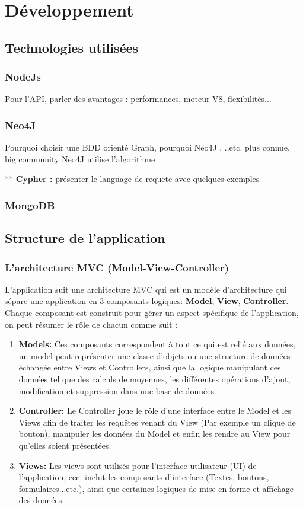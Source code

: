 \chapter{Développement}
\section{Technologies utilisées}
\subsection{NodeJs}
Pour l'API, parler des avantages : performances, moteur V8, flexibilités...  
\subsection{Neo4J}
Pourquoi choisir une BDD orienté Graph, pourquoi Neo4J , ..etc.
plus connue, big community
Neo4J utilise l'algorithme 

** \textbf{Cypher : } présenter le language de requete avec quelques exemples
\subsection{MongoDB}
		
\section{Structure de l'application}
	\subsection{L'architecture MVC (Model-View-Controller)}
	L'application suit une architecture MVC qui est un modèle d'architecture qui sépare une application en 3 composants logiques: \textbf{Model}, \textbf{View}, \textbf{Controller}.
	Chaque composant est construit pour gérer un aspect spécifique de l'application, on peut résumer le rôle de chacun comme suit :
	\begin{enumerate}
	\item \textbf{Models: } Ces composants correspondent à tout ce qui est relié aux données, un model peut représenter une classe d'objets ou une structure de données échangée entre Views et Controllers, ainsi que la logique manipulant ces données tel que des calculs de moyennes, les différentes opérations d'ajout, modification et suppression dans une base de données.
	\item \textbf{Controller: } Le Controller joue le rôle d'une interface entre le Model et les Views afin de traiter les requêtes venant du View (Par exemple un clique de bouton), manipuler les données du Model et enfin les rendre au View pour qu'elles soient présentées.
	\item \textbf{Views:} Les views sont utilisés pour l'interface utilisateur (UI) de l'application, ceci inclut les composants d'interface (Textes, boutons, formulaires...etc.), ainsi que certaines logiques de mise en forme et affichage des données.
	\end{enumerate}
	
